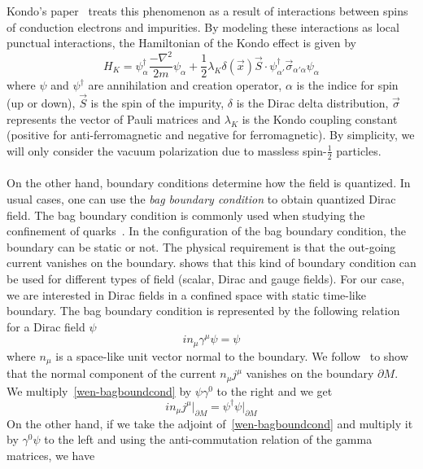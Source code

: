 Kondo's paper~\cite{Kondo1964} treats this phenomenon as a result of interactions between spins of conduction electrons and impurities.
By modeling these interactions as local punctual interactions,
the Hamiltonian of the Kondo effect is given by~\cite{Erdmenger2013}
\begin{equation}\label{vacuum-kondohamiltonian}
H_K = \psi_\alpha^\dagger \frac{-\nabla^2}{2m}\psi_\alpha +
\frac 1 2\lambda_K \delta(\vec{x})\vec{S}\cdot \psi_{\alpha'}^\dagger  \vec{\sigma}_{\alpha' \alpha} \psi_\alpha
\end{equation}
where $\psi$ and $\psi^\dagger$ are annihilation and creation operator, 
$\alpha$ is the indice for spin (up or down), 
$\vec{S}$ is the spin of the impurity,
$\delta$ is the Dirac delta distribution,
$\vec{\sigma}$ represents the vector of Pauli matrices and $\lambda_K$ is the Kondo coupling constant (positive for anti-ferromagnetic and negative for ferromagnetic).
By simplicity, we will only consider the vacuum polarization due to massless spin-$\frac 1 2$ particles. \\\\
%
On the other hand, boundary conditions determine how the field is quantized.
In usual cases, one can use the \textit{bag boundary condition} to obtain quantized Dirac field.
The bag boundary condition is commonly used when studying the confinement of quarks~\cite{Hasenfratz1978}.
In the configuration of the bag boundary condition, the boundary can be static or not. 
The physical requirement is that the out-going current vanishes on the boundary.
\cite{Chodos1974} shows that this kind of boundary condition can be used for different types of field (scalar, Dirac and gauge fields). 
For our case, we are interested in Dirac fields in a confined space with static time-like boundary.
The bag boundary condition is represented by the following relation for a Dirac field $\psi$ 
\begin{equation}\label{wen-bagboundcond}
i n_\mu\gamma^\mu \psi = \psi
\end{equation}
where $n_\mu$ is a space-like unit vector normal to the boundary.
We follow~\cite{Stokes2015} to show that the normal component of the current $n_\mu j^\mu$ vanishes on the boundary $\partial M$.
We multiply~\cref{wen-bagboundcond} by $\psi\gamma^0$ to the right and we get
\begin{equation*}
i n_\mu j^\mu \big\vert_{\partial M}= \psi^\dagger\psi \big\vert_{\partial M}
\end{equation*}
On the other hand, if we take the adjoint of~\cref{wen-bagboundcond} and multiply it by $\gamma^0\psi$ to the left and using the anti-commutation relation of the gamma matrices, we have
